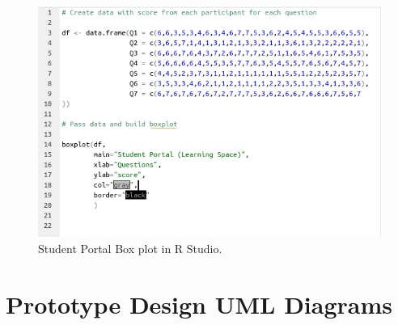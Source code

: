 \documentclass[lettersize,journal]{IEEEtran}
\begin{document}
\begin{figure}[h!]
                \includegraphics[width=0.7\paperwidth]{images/learningSpaceRcode.png}
                \caption{Student Portal Box plot in R Studio.}
                \label{figure 4}
\end{figure}

\clearpage
\section{{Prototype Design UML Diagrams}}
\end{document}
